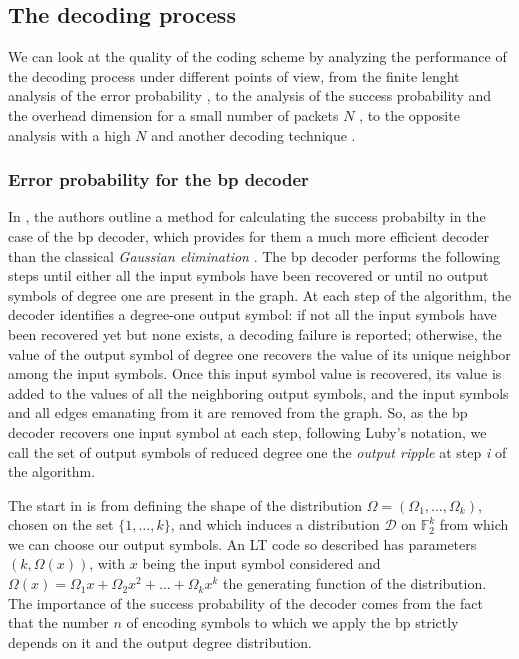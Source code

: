 \subsection{The decoding process}
We can look at the quality of the coding scheme by analyzing the performance of the decoding process under different points of view, from the finite lenght analysis of the error probability \cite{Karp2004}, to the analysis of the success probability and the overhead dimension for a small number of packets $N$ \cite{Hyytia2007}, to the opposite analysis with a high $N$ and another decoding technique \cite{Lu}.

\subsubsection{Error probability for the \gls{bp} decoder}
In \cite{Karp2004}, the authors outline a method for calculating the success probabilty in the case of the \gls{bp} decoder, which provides for them a much more efficient decoder than the classical \textit{Gaussian elimination} \cite{Shokrollahi2006}. The \gls{bp} decoder performs the following steps until either all the input symbols have been recovered or until no output symbols of degree one are present in the graph. At each step of the algorithm, the decoder identifies a degree-one output symbol: if not all the input symbols have been recovered yet but none exists, a decoding failure is reported; otherwise, the value of the output symbol of degree one recovers the value of its unique neighbor among the input symbols. Once this input symbol value is recovered, its value is added to the values of all the neighboring output symbols, and the input symbols and all edges emanating from it are removed from the graph. So, as the \gls{bp} decoder recovers one input symbol at each step, following Luby’s notation, we call the set of output symbols of reduced degree one the \textit{output ripple} at step \textit{i} of the algorithm. \cite{Shokrollahi2006}

The start in \cite{Karp2004} is from defining the shape of the distribution $\Omega = (\Omega_1,\dots,\Omega_k)$, chosen on the set $\{1,\dots,k\}$, and which induces a distribution $\mathcal{D}$ on $\mathbb{F}_2^k$ from which we can choose our output symbols. An LT code so described has parameters $(k,\Omega(x))$, with $x$ being the input symbol considered and $\Omega(x) = \Omega_1x+\Omega_2x^2+\dots+\Omega_kx^k$ the generating function of the distribution. The importance of the success probability of the decoder comes from the fact that the number $n$ of encoding symbols to which we apply the \gls{bp} strictly depends on it and the output degree distribution.

